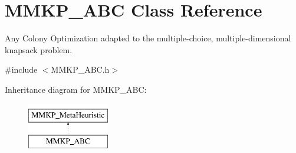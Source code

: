 \hypertarget{class_m_m_k_p___a_b_c}{\section{M\+M\+K\+P\+\_\+\+A\+B\+C Class Reference}
\label{class_m_m_k_p___a_b_c}
}


Any Colony Optimization adapted to the multiple-\/choice, multiple-\/dimensional knapsack problem.  




{\ttfamily \#include $<$M\+M\+K\+P\+\_\+\+A\+B\+C.\+h$>$}

Inheritance diagram for M\+M\+K\+P\+\_\+\+A\+B\+C\+:\begin{figure}[H]
\begin{center}
\leavevmode
\includegraphics[height=2.000000cm]{class_m_m_k_p___a_b_c}
\end{center}
\end{figure}
